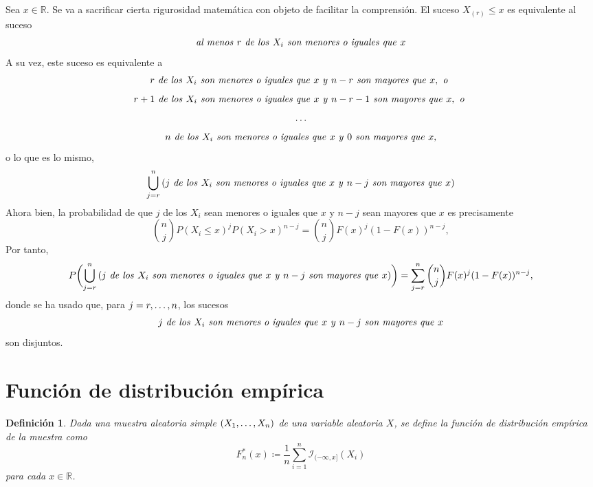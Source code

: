 \documentclass[11pt]{report}
\makeatletter
\renewenvironment{proof}[1][\proofname]{\par
  \pushQED{\qed}%
  \normalfont \topsep\z@skip %
  \trivlist
  \item[\hskip\labelsep
        \itshape
    #1\@addpunct{.}]\ignorespaces
}{%
  \popQED\endtrivlist\@endpefalse
}
\newtheorem{definition}{Definición}
\theoremstyle{definition}
\newcommand{\R}{\mathbb R}
\makeatother
\begin{document}
\begin{proof}
Sea $x \in \R$. Se va a sacrificar cierta rigurosidad matemática con objeto de facilitar la comprensión. El suceso $X_{(r)} \leq x$ es equivalente al suceso
\[\textup{\emph{al menos }} r \textup{\emph{ de los }} X_i \textup{\emph{ son menores o iguales que }} x\]
A su vez, este suceso es equivalente a
\[
r \textup{\emph{ de los }} X_i \textup{\emph{ son menores o iguales que }} x \textup{\emph{ y }} n-r \textup{\emph{ son mayores que }} x, \textup{\emph{ o }}\]
\[r+1 \textup{\emph{ de los }} X_i \textup{\emph{ son menores o iguales que }} x \textup{\emph{ y }} n-r-1 \textup{\emph{ son mayores que }} x, \textup{\emph{ o }}\]
\[\mathellipsis\]
\[n \textup{\emph{ de los }} X_i \textup{\emph{ son menores o iguales que }} x \textup{\emph{ y }} 0 \textup{\emph{ son mayores que }} x,\]
o lo que es lo mismo,
\[\bigcup_{j=r}^n \, (j \textup{\emph{ de los }} X_i \textup{\emph{ son menores o iguales que }} x \textup{\emph{ y }} n-j \textup{\emph{ son mayores que }} x)\]
Ahora bien, la probabilidad de que $j$ de los $X_i$ sean menores o iguales que $x$ y $n-j$ sean mayores que $x$ es precisamente
\[\binom{n}{j}P(X_i \leq x) ^jP(X_i > x)^{n-j} = \binom{n}{j}F(x)^j(1-F(x))^{n-j},\]
Por tanto,
\[P\biggl(\bigcup_{j=r}^n \, (j \textup{\emph{ de los }} X_i \textup{\emph{ son menores o iguales que }} x \textup{\emph{ y }} n-j \textup{\emph{ son mayores que }} x)\biggr) = \sum_{j=r}^n\binom{n}{j}F(x)^j(1-F(x))^{n-j},\]
donde se ha usado que, para $j =r,\mathellipsis,n$, los sucesos
\[j \textup{\emph{ de los }} X_i \textup{\emph{ son menores o iguales que }} x \textup{\emph{ y }} n-j \textup{\emph{ son mayores que }} x\]
son disjuntos.
\end{proof}

\section{Función de distribución empírica}

\begin{definition}
Dada una muestra aleatoria simple $(X_1,\mathellipsis,X_n)$ de una variable aleatoria $X$, se define la \emph{función de distribución empírica de la muestra} como
\[F_n^*(x) \coloneqq \frac{1}{n} \sum_{i=1}^n \mathcal{I}_{(-\infty,x]}(X_i)\]
para cada $x \in \R$.
\end{definition}
\end{document}
